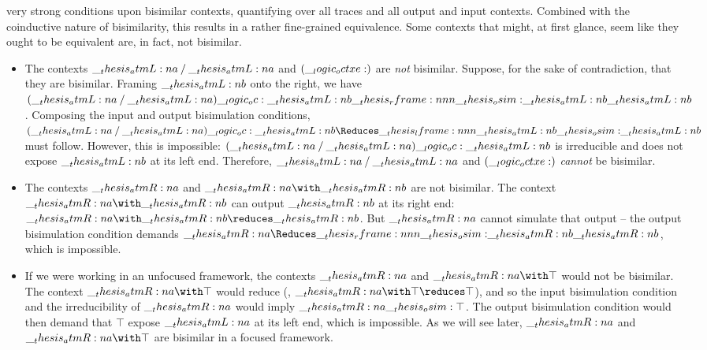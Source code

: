  very strong conditions upon bisimilar contexts, quantifying over all traces %
and
all output and input contexts.
Combined with the coinductive nature of bisimilarity, this results in a rather fine-grained equivalence.
Some contexts that might, at first glance, seem like they ought to be equivalent are, in fact, not bisimilar.
\begin{itemize}
\item The contexts $\__thesis_atmL:n {a} \mathbin { / } \__thesis_atmL:n {a}$ and $(\__logic_octxe:)$ are \emph{not} bisimilar.
  Suppose, for the sake of contradiction, that they are bisimilar.
  Framing $\__thesis_atmL:n {b}$ onto the right, we have $(\atmL{a} \pmir \atmL{a}) \oc \atmL{b} \rframe{\osim}{\atmL{b}} \atmL{b}$.
  Composing the input and output bisimulation conditions, $(\atmL{a} \pmir \atmL{a}) \oc \atmL{b} \Reduces\lframe{\atmL{b}}{\osim} \atmL{b}$ must follow.
  However, this is impossible: $(\__thesis_atmL:n {a} \mathbin { / } \__thesis_atmL:n {a}) \__logic_oc: \__thesis_atmL:n {b}$ is irreducible and does not expose $\__thesis_atmL:n {b}$ at its left end.
  Therefore, $\__thesis_atmL:n {a} \mathbin { / } \__thesis_atmL:n {a}$ and $(\__logic_octxe:)$ \emph{cannot} be bisimilar.

\item The contexts $\__thesis_atmR:n {a}$ and $\atmR{a} \with \atmR{b}$ are not bisimilar.
  The context $\atmR{a} \with \atmR{b}$ can output $\__thesis_atmR:n {b}$ at its right end: $\atmR{a} \with \atmR{b} \reduces \atmR{b}$.
  But $\__thesis_atmR:n {a}$ cannot simulate that output -- the output bisimulation condition demands $\atmR{a} \Reduces\rframe{\osim}{\atmR{b}} \atmR{b}$, which is impossible.

\item If we were working in an unfocused framework, the contexts $\__thesis_atmR:n {a}$ and $\atmR{a} \with \top$ would not be bisimilar.
  The context $\atmR{a} \with \top$ would reduce (\ie, $\atmR{a} \with \top \reduces \top$), and so the input bisimulation condition and the irreducibility of $\__thesis_atmR:n {a}$ would imply $\__thesis_atmR:n {a} \__thesis_osim: \top$.
  The output bisimulation condition would then demand that $\top$ expose $\__thesis_atmL:n {a}$ at its left end, which is impossible.
  As we will see later, $\__thesis_atmR:n {a}$ and $\atmR{a} \with \top$ are bisimilar in a focused framework.
\end{itemize}

